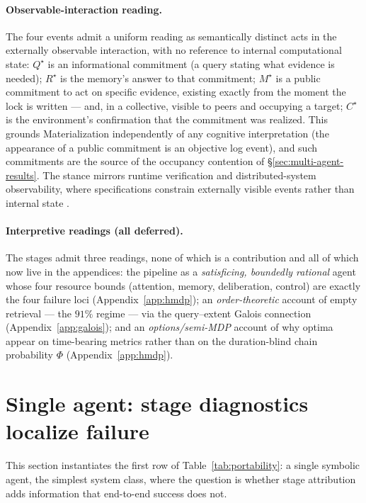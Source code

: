 \documentclass{article}
\begin{document}
\paragraph{Observable-interaction reading.} The four events admit a
uniform reading as semantically distinct acts in the externally
observable interaction, with no reference to internal computational
state: $Q^\star$ is an informational commitment (a query stating what
evidence is needed); $R^\star$ is the memory's answer to that
commitment; $M^\star$ is a public commitment to act on specific
evidence, existing exactly from the moment the lock is written ---
and, in a collective, visible to peers and occupying a target;
$C^\star$ is the environment's confirmation that the commitment was
realized. This grounds Materialization independently of any cognitive
interpretation (the appearance of a public commitment is an objective
log event), and such commitments are the source of the
occupancy contention of \S\ref{sec:multi-agent-results}. The stance
mirrors runtime verification and distributed-system observability,
where specifications constrain externally visible events rather than
internal state \citep{leucker2009runtime}.

\paragraph{Interpretive readings (all deferred).} The stages admit
three readings, none of which is a contribution and all of which now
live in the appendices: the pipeline as a \emph{satisficing, boundedly
rational} agent whose four resource bounds (attention, memory,
deliberation, control) are exactly the four failure loci
(Appendix~\ref{app:hmdp}); an \emph{order-theoretic} account of empty
retrieval --- the $91\%$ regime --- via the query--extent Galois
connection (Appendix~\ref{app:galois}); and an \emph{options/semi-MDP}
account of why optima appear on time-bearing metrics rather than on
the duration-blind chain probability $\Phi$
(Appendix~\ref{app:hmdp}).

\section{Single agent: stage diagnostics localize failure}
\label{sec:single}

This section instantiates the first row of
Table~\ref{tab:portability}: a single symbolic agent, the simplest
system class, where the question is whether stage attribution adds
information that end-to-end success does not.
\end{document}
